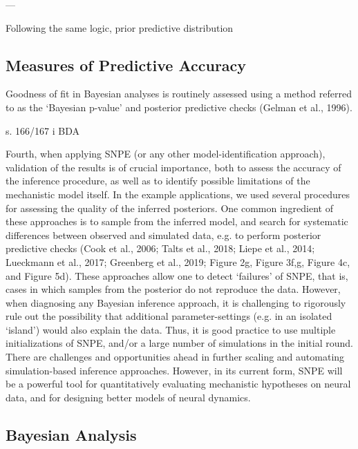 ---

Following the same logic, prior predictive distribution  


\subsection{Measures of Predictive Accuracy}

Goodness of fit in Bayesian analyses is routinely assessed using a method referred to as the ‘Bayesian p-value’ and posterior predictive checks (Gelman et al., 1996).

s. 166/167 i BDA 


Fourth, when applying SNPE (or any other model-identification approach), validation of the results is of crucial importance, both to assess the accuracy of the inference procedure, as well as to identify possible limitations of the mechanistic model itself. In the example applications, we used several procedures for assessing the quality of the inferred posteriors. One common ingredient of these approaches is to sample from the inferred model, and search for systematic differences between observed and simulated data, e.g. to perform posterior predictive checks (Cook et al., 2006; Talts et al., 2018; Liepe et al., 2014; Lueckmann et al., 2017; Greenberg et al., 2019; Figure 2g, Figure 3f,g, Figure 4c, and Figure 5d). These approaches allow one to detect ‘failures’ of SNPE, that is, cases in which samples from the posterior do not reproduce the data. However, when diagnosing any Bayesian inference approach, it is challenging to rigorously rule out the possibility that additional parameter-settings (e.g. in an isolated ‘island’) would also explain the data. Thus, it is good practice to use multiple initializations of SNPE, and/or a large number of simulations in the initial round. There are challenges and opportunities ahead in further scaling and automating simulation-based inference approaches. However, in its current form, SNPE will be a powerful tool for quantitatively evaluating mechanistic hypotheses on neural data, and for designing better models of neural dynamics.

\subsection{Bayesian Analysis}



